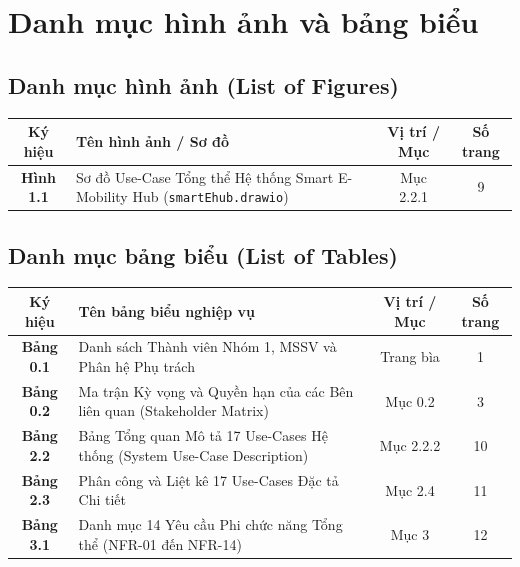\documentclass[12pt,a4paper]{report}
\begin{document}
\section*{Danh mục hình ảnh và bảng biểu}

\subsection*{Danh mục hình ảnh (List of Figures)}
\begin{center}
\renewcommand{\arraystretch}{1.3}
\begin{tabularx}{\textwidth}{|c|X|c|c|}
    \hline
    \textbf{Ký hiệu} & \textbf{Tên hình ảnh / Sơ đồ} & \textbf{Vị trí / Mục} & \textbf{Số trang} \\
    \hline
    \textbf{Hình 1.1} & Sơ đồ Use-Case Tổng thể Hệ thống Smart E-Mobility Hub (\texttt{smartEhub.drawio}) & Mục 2.2.1 & 9 \\
    \hline
\end{tabularx}
\end{center}

\subsection*{Danh mục bảng biểu (List of Tables)}
\begin{center}
\renewcommand{\arraystretch}{1.3}
\begin{tabularx}{\textwidth}{|c|X|c|c|}
    \hline
    \textbf{Ký hiệu} & \textbf{Tên bảng biểu nghiệp vụ} & \textbf{Vị trí / Mục} & \textbf{Số trang} \\
    \hline
    \textbf{Bảng 0.1} & Danh sách Thành viên Nhóm 1, MSSV và Phân hệ Phụ trách & Trang bìa & 1 \\
    \hline
    \textbf{Bảng 0.2} & Ma trận Kỳ vọng và Quyền hạn của các Bên liên quan (Stakeholder Matrix) & Mục 0.2 & 3 \\
    \hline
    \textbf{Bảng 2.2} & Bảng Tổng quan Mô tả 17 Use-Cases Hệ thống (System Use-Case Description) & Mục 2.2.2 & 10 \\
    \hline
    \textbf{Bảng 2.3} & Phân công và Liệt kê 17 Use-Cases Đặc tả Chi tiết & Mục 2.4 & 11 \\
    \hline
    \textbf{Bảng 3.1} & Danh mục 14 Yêu cầu Phi chức năng Tổng thể (NFR-01 đến NFR-14) & Mục 3 & 12 \\
    \hline
\end{tabularx}
\end{center}
\end{document}
